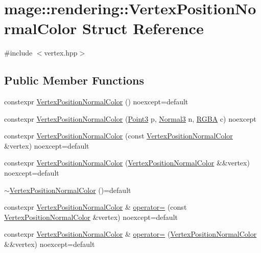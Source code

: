 \hypertarget{structmage_1_1rendering_1_1_vertex_position_normal_color}{}\section{mage\+:\+:rendering\+:\+:Vertex\+Position\+Normal\+Color Struct Reference}
\label{structmage_1_1rendering_1_1_vertex_position_normal_color}


{\ttfamily \#include $<$vertex.\+hpp$>$}

\subsection*{Public Member Functions}
\begin{DoxyCompactItemize}
\item 
constexpr \mbox{\hyperlink{structmage_1_1rendering_1_1_vertex_position_normal_color_af43537af55a5ed53f4828b5e7ea0f5c2}{Vertex\+Position\+Normal\+Color}} () noexcept=default
\item 
constexpr \mbox{\hyperlink{structmage_1_1rendering_1_1_vertex_position_normal_color_aff58865387d88b7aa3b40b76eb476850}{Vertex\+Position\+Normal\+Color}} (\mbox{\hyperlink{structmage_1_1_point3}{Point3}} p, \mbox{\hyperlink{structmage_1_1_normal3}{Normal3}} n, \mbox{\hyperlink{structmage_1_1_r_g_b_a}{R\+G\+BA}} c) noexcept
\item 
constexpr \mbox{\hyperlink{structmage_1_1rendering_1_1_vertex_position_normal_color_ae5112aeadb68fc216e58168600417e31}{Vertex\+Position\+Normal\+Color}} (const \mbox{\hyperlink{structmage_1_1rendering_1_1_vertex_position_normal_color}{Vertex\+Position\+Normal\+Color}} \&vertex) noexcept=default
\item 
constexpr \mbox{\hyperlink{structmage_1_1rendering_1_1_vertex_position_normal_color_ac6247b996c107e6daa2204f98d38b2a9}{Vertex\+Position\+Normal\+Color}} (\mbox{\hyperlink{structmage_1_1rendering_1_1_vertex_position_normal_color}{Vertex\+Position\+Normal\+Color}} \&\&vertex) noexcept=default
\item 
\mbox{\hyperlink{structmage_1_1rendering_1_1_vertex_position_normal_color_af78e3787e0971664a9114cdf4335101c}{$\sim$\+Vertex\+Position\+Normal\+Color}} ()=default
\item 
constexpr \mbox{\hyperlink{structmage_1_1rendering_1_1_vertex_position_normal_color}{Vertex\+Position\+Normal\+Color}} \& \mbox{\hyperlink{structmage_1_1rendering_1_1_vertex_position_normal_color_ae3bdf697f0dae8b01b43c6a8249ee817}{operator=}} (const \mbox{\hyperlink{structmage_1_1rendering_1_1_vertex_position_normal_color}{Vertex\+Position\+Normal\+Color}} \&vertex) noexcept=default
\item 
constexpr \mbox{\hyperlink{structmage_1_1rendering_1_1_vertex_position_normal_color}{Vertex\+Position\+Normal\+Color}} \& \mbox{\hyperlink{structmage_1_1rendering_1_1_vertex_position_normal_color_a2528c797701a7102e6895d5c5d04cf27}{operator=}} (\mbox{\hyperlink{structmage_1_1rendering_1_1_vertex_position_normal_color}{Vertex\+Position\+Normal\+Color}} \&\&vertex) noexcept=default
\end{DoxyCompactItemize}
